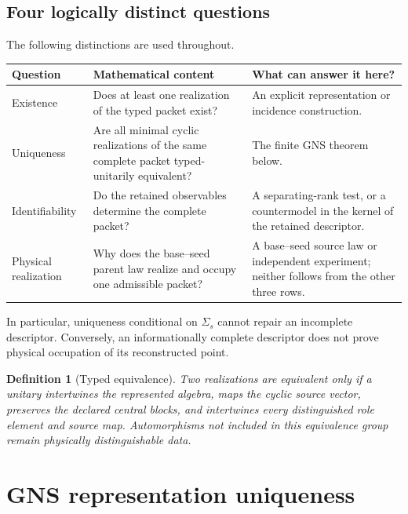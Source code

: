 \documentclass[11pt]{article}
\newtheorem{definition}{Definition}
\begin{document}
\subsection{Four logically distinct questions}

The following distinctions are used throughout.
\begin{longtable}{p{.18\linewidth}p{.35\linewidth}p{.36\linewidth}}
\toprule
Question & Mathematical content & What can answer it here?\\
\midrule
\endhead
Existence & Does at least one realization of the typed packet exist? & An
explicit representation or incidence construction.\\
Uniqueness & Are all minimal cyclic realizations of the same complete packet
typed-unitarily equivalent? & The finite GNS theorem below.\\
Identifiability & Do the retained observables determine the complete packet? &
A separating-rank test, or a countermodel in the kernel of the retained
descriptor.\\
Physical realization & Why does the base--seed parent law realize and occupy
one admissible packet? & A
base--seed source law or independent experiment; neither follows from the
other three rows.\\
\bottomrule
\end{longtable}

In particular, uniqueness conditional on \(\Sigma_s\) cannot repair an
incomplete descriptor.  Conversely, an informationally complete descriptor
does not prove physical occupation of its reconstructed point.

\begin{definition}[Typed equivalence]
Two realizations are equivalent only if a unitary intertwines the represented
algebra, maps the cyclic source vector, preserves the declared central blocks,
and intertwines every distinguished role element and source map.  Automorphisms
not included in this equivalence group remain physically distinguishable data.
\end{definition}

\section{GNS representation uniqueness}
\end{document}

